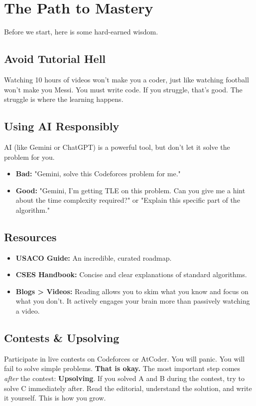 \documentclass[12pt, a4paper]{report}
\begin{document}
\section{The Path to Mastery}
Before we start, here is some hard-earned wisdom.

\subsection{Avoid Tutorial Hell}
Watching 10 hours of videos won't make you a coder, just like watching football won't make you Messi. You must write code. If you struggle, that's good. The struggle is where the learning happens.

\subsection{Using AI Responsibly}
AI (like Gemini or ChatGPT) is a powerful tool, but don't let it solve the problem for you.
\begin{itemize}
    \item \textbf{Bad:} "Gemini, solve this Codeforces problem for me."
    \item \textbf{Good:} "Gemini, I'm getting TLE on this problem. Can you give me a hint about the time complexity required?" or "Explain this specific part of the algorithm."
\end{itemize}

\subsection{Resources}
\begin{itemize}
    \item \textbf{USACO Guide:} An incredible, curated roadmap.
    \item \textbf{CSES Handbook:} Concise and clear explanations of standard algorithms.
    \item \textbf{Blogs > Videos:} Reading allows you to skim what you know and focus on what you don't. It actively engages your brain more than passively watching a video.
\end{itemize}

\subsection{Contests \& Upsolving}
Participate in live contests on Codeforces or AtCoder. You will panic. You will fail to solve simple problems. \textbf{That is okay.}
The most important step comes \textit{after} the contest: \textbf{Upsolving}.
If you solved A and B during the contest, try to solve C immediately after. Read the editorial, understand the solution, and write it yourself. This is how you grow.
\end{document}

